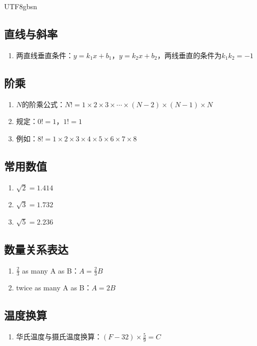 \documentclass[12pt]{article}
\begin{document}
\begin{CJK*}{UTF8}{gbsn}
\subsection{直线与斜率}
\begin{enumerate}
    \item 两直线垂直条件：$y = k_1x + b_1$，$y = k_2x + b_2$，两线垂直的条件为$k_1k_2 = -1$
\end{enumerate}

\subsection{阶乘}
\begin{enumerate}
    \item $N$的阶乘公式：$N! = 1 \times 2 \times 3 \times \cdots \times (N-2) \times (N-1) \times N$
    \item 规定：$0! = 1$，$1! = 1$
    \item 例如：$8! = 1 \times 2 \times 3 \times 4 \times 5 \times 6 \times 7 \times 8$
\end{enumerate}

\subsection{常用数值}
\begin{enumerate}
    \item $\sqrt{2} = 1.414$
    \item $\sqrt{3} = 1.732$
    \item $\sqrt{5} = 2.236$
\end{enumerate}

\subsection{数量关系表达}
\begin{enumerate}
    \item $\frac{2}{3}$ as many A as B：$A = \frac{2}{3}B$
    \item twice as many A as B：$A = 2B$
\end{enumerate}

\subsection{温度换算}
\begin{enumerate}
    \item 华氏温度与摄氏温度换算：$(F-32) \times \frac{5}{9} = C$
\end{enumerate}


\end{CJK*}
\end{document}
